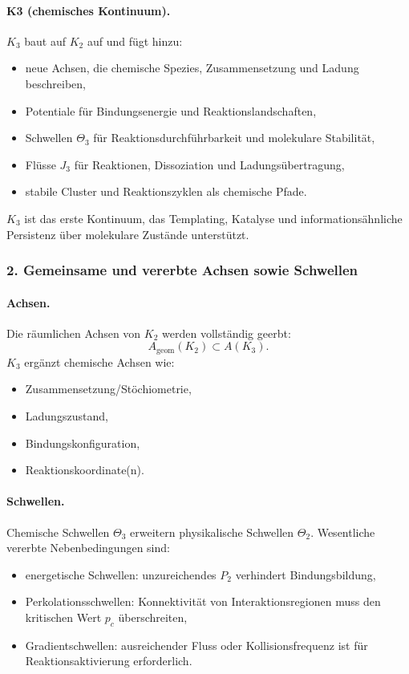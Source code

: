 \paragraph{K3 (chemisches Kontinuum).}
$K_3$ baut auf $K_2$ auf und fügt hinzu:
\begin{itemize}
  \item neue Achsen, die chemische Spezies, Zusammensetzung und Ladung
        beschreiben,
  \item Potentiale für Bindungsenergie und Reaktionslandschaften,
  \item Schwellen $\Theta_3$ für Reaktionsdurchführbarkeit und molekulare Stabilität,
  \item Flüsse $J_3$ für Reaktionen, Dissoziation und Ladungsübertragung,
  \item stabile Cluster und Reaktionszyklen als chemische Pfade.
\end{itemize}

$K_3$ ist das erste Kontinuum, das Templating, Katalyse und
informationsähnliche Persistenz über molekulare Zustände unterstützt.

\subsubsection{2. Gemeinsame und vererbte Achsen sowie Schwellen}

\paragraph{Achsen.}
Die räumlichen Achsen von $K_2$ werden vollständig geerbt:
\[
A_{\mathrm{geom}}(K_2) \subset A(K_3).
\]
$K_3$ ergänzt chemische Achsen wie:
\begin{itemize}
  \item Zusammensetzung/Stöchiometrie,
  \item Ladungszustand,
  \item Bindungskonfiguration,
  \item Reaktionskoordinate(n).
\end{itemize}

\paragraph{Schwellen.}
Chemische Schwellen $\Theta_3$ erweitern physikalische Schwellen $\Theta_2$.
Wesentliche vererbte Nebenbedingungen sind:
\begin{itemize}
  \item energetische Schwellen: unzureichendes $P_2$ verhindert Bindungsbildung,
  \item Perkolationsschwellen: Konnektivität von Interaktionsregionen muss den
        kritischen Wert $p_c$ überschreiten,
  \item Gradientschwellen: ausreichender Fluss oder Kollisionsfrequenz ist für
        Reaktionsaktivierung erforderlich.
\end{itemize}

